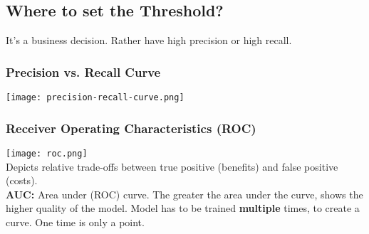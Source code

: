 \subsection{Where to set the Threshold?}
It's a business decision. Rather have high precision or high recall.

\subsubsection{Precision vs. Recall Curve}
\texttt{[image: precision-recall-curve.png]}

\subsubsection{Receiver Operating Characteristics (ROC)}
\texttt{[image: roc.png]}\\
Depicts relative trade-offs between true positive (benefits) and false positive (costs).\\
\textbf{AUC:} Area under (ROC) curve. 
The greater the area under the curve, shows the higher quality of the model.
Model has to be trained \textbf{multiple} times, to create a curve. One time is only a point.
